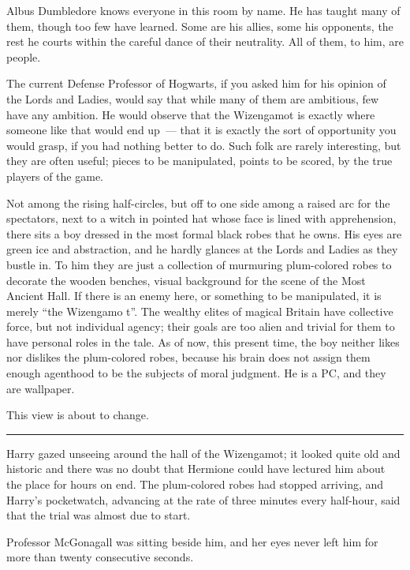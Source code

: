 Albus Dumbledore knows everyone in this room by name. He has taught many of them, though too few have learned. Some are his allies, some his opponents, the rest he courts within the careful dance of their neutrality. All of them, to him, are people.

The current Defense Professor of Hogwarts, if you asked him for his opinion of the Lords and Ladies, would say that while many of them are ambitious, few have any ambition. He would observe that the Wizengamot is exactly where someone like that would end up~--- that it is exactly the sort of opportunity you would grasp, if you had nothing better to do. Such folk are rarely interesting, but they are often useful; pieces to be manipulated, points to be scored, by the true players of the game.

Not among the rising half-circles, but off to one side among a raised arc for the spectators, next to a witch in pointed hat whose face is lined with apprehension, there sits a boy dressed in the most formal black robes that he owns. His eyes are green ice and abstraction, and he hardly glances at the Lords and Ladies as they bustle in. To him they are just a collection of murmuring plum-colored robes to decorate the wooden benches, visual background for the scene of the Most Ancient Hall. If there is an enemy here, or something to be manipulated, it is merely ``the Wizengamo t''. The wealthy elites of magical Britain have collective force, but not individual agency; their goals are too alien and trivial for them to have personal roles in the tale. As of now, this present time, the boy neither likes nor dislikes the plum-colored robes, because his brain does not assign them enough agenthood to be the subjects of moral judgment. He is a PC, and they are wallpaper.

This view is about to change.

\begin{center}\rule{3in}{0.4pt}\end{center}

Harry gazed unseeing around the hall of the Wizengamot; it looked quite old and historic and there was no doubt that Hermione could have lectured him about the place for hours on end. The plum-colored robes had stopped arriving, and Harry's pocketwatch, advancing at the rate of three minutes every half-hour, said that the trial was almost due to start.

Professor McGonagall was sitting beside him, and her eyes never left him for more than twenty consecutive seconds.


